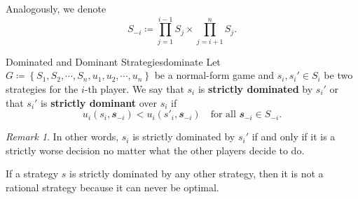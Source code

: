 \documentclass[math]{amznotes}
\theoremstyle{remark}
\newtheorem*{remark}{Remark}
\begin{document}
Analogously, we denote
\begin{equation*}
    S_{-i} \coloneqq \prod_{j = 1}^{i - 1}S_j \times \prod_{j = i + 1}^nS_j.
\end{equation*}
\begin{dfnbox}{Dominated and Dominant Strategies}{dominate}
    Let $G \coloneqq \left\{S_1, S_2, \cdots, S_n, u_1, u_2, \cdots, u_n\right\}$ be a normal-form game and $s_i, s_i' \in S_i$ be two strategies for the $i$-th player. We say that $s_i$ is {\color{red} \textbf{strictly dominated}} by $s_i'$ or that $s_i'$ is {\color{red} \textbf{strictly dominant}} over $s_i$ if 
    \begin{equation*}
        u_i\left(s_i, \mathbfit{s}_{-i}\right) < u_i\left(s'_i, \mathbfit{s}_{-i}\right) \quad \textrm{for all } \mathbfit{s}_{-i} \in S_{-i}.
    \end{equation*}
\end{dfnbox}
\begin{notebox}
    \begin{remark}
        In other words, $s_i$ is strictly dominated by $s_i'$ if and only if it is a strictly worse decision no matter what the other players decide to do.
    \end{remark}
\end{notebox}
If a strategy $s$ is strictly dominated by any other strategy, then it is not a rational strategy because it can never be optimal.
\end{document}
